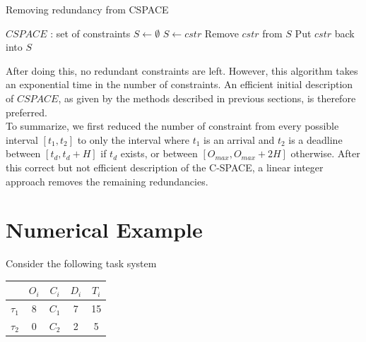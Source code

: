 \documentclass[conference]{IEEEtran}
\begin{document}
\begin{algorithm}
\caption{Removing redundancy from CSPACE}
\label{alg:prunRedun}
  \begin{algorithmic}[1]
    \STATE $CSPACE$ : set of constraints
    \STATE $S \leftarrow \emptyset$
    \STATE {}
        \STATE $S \leftarrow cstr$
      \ENDIF
    \ENDFOR
    \STATE {}
      \STATE Remove $cstr$ from $S$
        \STATE Put $cstr$ back into $S$
      \ENDIF
    \ENDFOR
  \end{algorithmic}
\end{algorithm}

After doing this, no redundant constraints are left. However, this algorithm takes an exponential time in the number of constraints. An efficient initial description of $CSPACE$, as given by the methods described in previous sections, is therefore preferred.\\

To summarize, we first reduced the number of constraint from every possible interval $[t_1, t_2]$ to only the interval where $t_1$ is an arrival and $t_2$ is a deadline between $[t_d, t_d + H]$ if $t_d$ exists, or between $[O_{max}, O_{max} + 2H]$ otherwise. After this correct but not efficient description of the C-SPACE, a linear integer approach removes the remaining redundancies.

\section{Numerical Example}

Consider the following task system

    \begin{center}
    \begin{tabular}{|r|c|c|c|c|}
     \hline
      & $O_i$ & $C_i$ & $D_i$ & $T_i$ \\
     \hline
     $\tau_1$ & 8 & $C_1$ & 7 & 15\\
     \hline
     $\tau_2$ & 0 & $C_2$ & 2 & 5\\
     \hline
    \end{tabular}
    \end{center}
    ~\\
\end{document}

